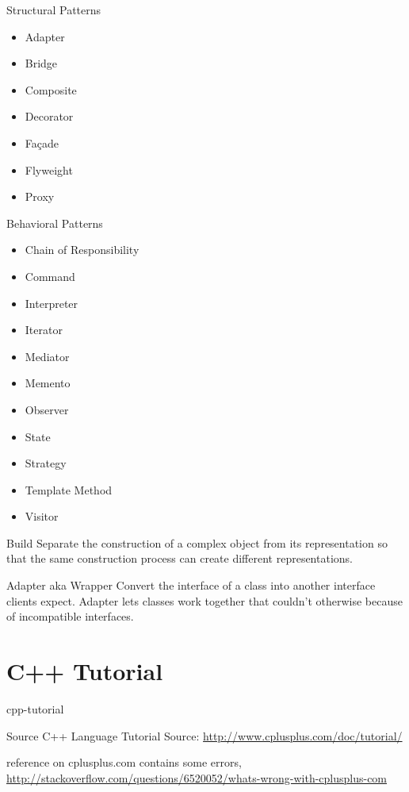 \documentclass{beamer}
\begin{document}
\begin{frame}{Structural Patterns}
\begin{itemize}
  \item Adapter
  \item Bridge
  \item Composite
  \item Decorator
  \item Façade
  \item Flyweight
  \item Proxy
\end{itemize}
\end{frame}

\begin{frame}{Behavioral Patterns}
\begin{itemize}
  \item Chain of Responsibility
  \item Command
  \item Interpreter
  \item Iterator
  \item Mediator
  \item Memento
  \item Observer
  \item State
  \item Strategy
  \item Template Method
  \item Visitor
\end{itemize}
\end{frame}

\begin{frame}{Build}
Separate the construction of a complex object from its representation so that
the same construction process can create different representations.
\end{frame}

\begin{frame}{Adapter aka Wrapper}
Convert the interface of a class into another interface clients expect. Adapter
lets classes work together that couldn't otherwise because of incompatible
interfaces.
\end{frame}

\part{C++ Tutorial}{cpp-tutorial}

\begin{frame}{Source}
C++ Language Tutorial
Source: \url{http://www.cplusplus.com/doc/tutorial/}
\begin{block}

reference on cplusplus.com contains some errors,
\url{http://stackoverflow.com/questions/6520052/whats-wrong-with-cplusplus-com}
\end{block}
\end{frame}
\end{document}
